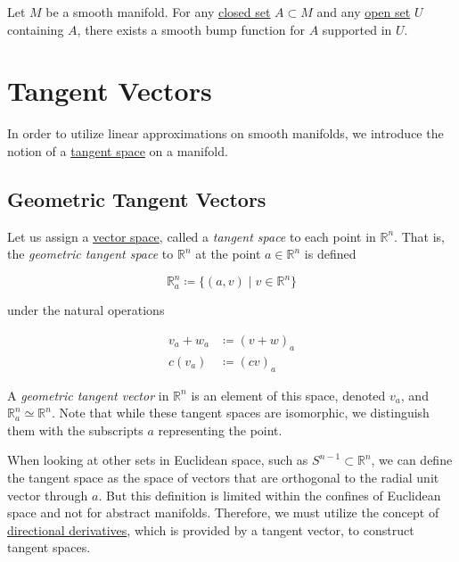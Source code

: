 \documentclass{article}
\newcounter{theorem}[section]
\newcounter{definition}[section]
\begin{document}
      \begin{theorem}
        \label{thm:existence-of-bump-functions}
        Let $M$ be a smooth manifold. For any \hyperref[pst-def:closed]{closed set} $A \subset M$ and any \hyperref[pst-def:open-set]{open set} $U$ containing $A$, there exists a smooth bump function for $A$ supported in $U$. 
      \end{theorem}

\section{Tangent Vectors}

  In order to utilize linear approximations on smooth manifolds, we introduce the notion of a \hyperref[mv-def:tangent-space]{tangent space} on a manifold. 

  \subsection{Geometric Tangent Vectors}

    Let us assign a \hyperref[lin-def:vector-space]{vector space}, called a \textit{tangent space} to each point in $\mathbb{R}^n$. That is, the \textit{geometric tangent space} to $\mathbb{R}^n$ at the point $a \in \mathbb{R}^n$ is defined

      \begin{equation}
        \mathbb{R}_a^n \coloneqq \{(a, v) \;|\; v \in \mathbb{R}^n \}
      \end{equation}

    under the natural operations

    \begin{align*}
      v_a + w_a & \coloneqq (v + w)_a \\
      c (v_a) & \coloneqq (c v)_a
    \end{align*}

    A \textit{geometric tangent vector} in $\mathbb{R}^n$ is an element of this space, denoted $v_a$, and $\mathbb{R}^n_a \simeq \mathbb{R}^n$. Note that while these tangent spaces are isomorphic, we distinguish them with the subscripts $a$ representing the point. 

    When looking at other sets in Euclidean space, such as $S^{n-1} \subset \mathbb{R}^n$, we can define the tangent space as the space of vectors that are orthogonal to the radial unit vector through $a$. But this definition is limited within the confines of Euclidean space and not for abstract manifolds. Therefore, we must utilize the concept of \hyperref[mv-def:directional-derivative]{directional derivatives}, which is provided by a tangent vector, to construct tangent spaces. 
\end{document}
